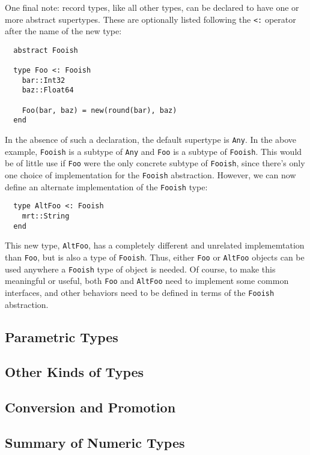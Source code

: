 \documentclass{article}
\renewcommand{\sec}[1]{\label{sec:#1}}
\begin{document}
One final note:
record types, like all other types, can be declared to have one or more abstract supertypes.
These are optionally listed following the \verb|<:| operator after the name of the new type:
\begin{verbatim}
  abstract Fooish

  type Foo <: Fooish
    bar::Int32
    baz::Float64

    Foo(bar, baz) = new(round(bar), baz)
  end
\end{verbatim}
In the absence of such a declaration, the default supertype is \verb|Any|.
In the above example, \verb|Fooish| is a subtype of \verb|Any| and \verb|Foo| is a subtype of \verb|Fooish|.
This would be of little use if \verb|Foo| were the only concrete subtype of \verb|Fooish|, since there's only one choice of implementation for the \verb|Fooish| abstraction.
However, we can now define an alternate implementation of the \verb|Fooish| type:
\begin{verbatim}
  type AltFoo <: Fooish
    mrt::String
  end
\end{verbatim}
This new type, \verb|AltFoo|, has a completely different and unrelated implememtation than \verb|Foo|, but is also a type of \verb|Fooish|.
Thus, either \verb|Foo| or \verb|AltFoo| objects can be used anywhere a \verb|Fooish| type of object is needed.
Of course, to make this meaningful or useful, both \verb|Foo| and \verb|AltFoo| need to implement some common interfaces, and other behaviors need to be defined in terms of the \verb|Fooish| abstraction.

\subsection{Parametric Types}\sec{parametric-types}

\subsection{Other Kinds of Types}\sec{other-kinds-of-types}

\subsection{Conversion and Promotion}\sec{conversion-and-promotion}

\subsection{Summary of Numeric Types}
\end{document}
